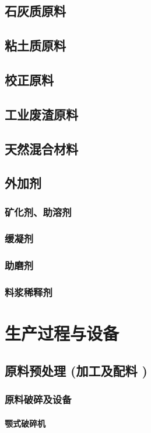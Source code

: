 \documentclass[UTF8]{../../ApplicationUniverse}
\begin{document}
    \subsection{石灰质原料}
    \subsection{粘土质原料}
    \subsection{校正原料}
    \subsection{工业废渣原料}
    \subsection{天然混合材料}
    \subsection{外加剂}
        \subsubsection{矿化剂、助溶剂}
        \subsubsection{缓凝剂}
        \subsubsection{助磨剂}
        \subsubsection{料浆稀释剂}
\section{生产过程与设备}
    \subsection{原料预处理 (加工及配料 )}
        \subsubsection{原料破碎及设备}
            \paragraph{颚式破碎机}
\end{document}
